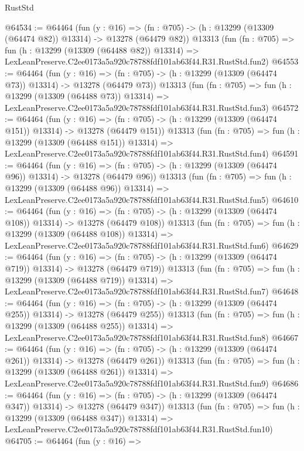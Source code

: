 \begin{lexlean}{RustStd}
\begin{coremodule}
@64534 := @64464
    (fun (y : @16) =>
    (fn : @705) -> (h : @13299 (@13309 (@64474 @82)) @13314) -> @13278 (@64479 @82))
    @13313
    (fun (fn : @705) =>
    fun (h : @13299 (@13309 (@64488 @82)) @13314) =>
    LexLeanPreserve.C2ee0173a5a920c78788fdf101ab63f44.R31.RustStd.fun2)
@64553 := @64464
    (fun (y : @16) =>
    (fn : @705) -> (h : @13299 (@13309 (@64474 @73)) @13314) -> @13278 (@64479 @73))
    @13313
    (fun (fn : @705) =>
    fun (h : @13299 (@13309 (@64488 @73)) @13314) =>
    LexLeanPreserve.C2ee0173a5a920c78788fdf101ab63f44.R31.RustStd.fun3)
@64572 := @64464
    (fun (y : @16) =>
    (fn : @705) -> (h : @13299 (@13309 (@64474 @151)) @13314) -> @13278 (@64479 @151))
    @13313
    (fun (fn : @705) =>
    fun (h : @13299 (@13309 (@64488 @151)) @13314) =>
    LexLeanPreserve.C2ee0173a5a920c78788fdf101ab63f44.R31.RustStd.fun4)
@64591 := @64464
    (fun (y : @16) =>
    (fn : @705) -> (h : @13299 (@13309 (@64474 @96)) @13314) -> @13278 (@64479 @96))
    @13313
    (fun (fn : @705) =>
    fun (h : @13299 (@13309 (@64488 @96)) @13314) =>
    LexLeanPreserve.C2ee0173a5a920c78788fdf101ab63f44.R31.RustStd.fun5)
@64610 := @64464
    (fun (y : @16) =>
    (fn : @705) -> (h : @13299 (@13309 (@64474 @108)) @13314) -> @13278 (@64479 @108))
    @13313
    (fun (fn : @705) =>
    fun (h : @13299 (@13309 (@64488 @108)) @13314) =>
    LexLeanPreserve.C2ee0173a5a920c78788fdf101ab63f44.R31.RustStd.fun6)
@64629 := @64464
    (fun (y : @16) =>
    (fn : @705) -> (h : @13299 (@13309 (@64474 @719)) @13314) -> @13278 (@64479 @719))
    @13313
    (fun (fn : @705) =>
    fun (h : @13299 (@13309 (@64488 @719)) @13314) =>
    LexLeanPreserve.C2ee0173a5a920c78788fdf101ab63f44.R31.RustStd.fun7)
@64648 := @64464
    (fun (y : @16) =>
    (fn : @705) -> (h : @13299 (@13309 (@64474 @255)) @13314) -> @13278 (@64479 @255))
    @13313
    (fun (fn : @705) =>
    fun (h : @13299 (@13309 (@64488 @255)) @13314) =>
    LexLeanPreserve.C2ee0173a5a920c78788fdf101ab63f44.R31.RustStd.fun8)
@64667 := @64464
    (fun (y : @16) =>
    (fn : @705) -> (h : @13299 (@13309 (@64474 @261)) @13314) -> @13278 (@64479 @261))
    @13313
    (fun (fn : @705) =>
    fun (h : @13299 (@13309 (@64488 @261)) @13314) =>
    LexLeanPreserve.C2ee0173a5a920c78788fdf101ab63f44.R31.RustStd.fun9)
@64686 := @64464
    (fun (y : @16) =>
    (fn : @705) -> (h : @13299 (@13309 (@64474 @347)) @13314) -> @13278 (@64479 @347))
    @13313
    (fun (fn : @705) =>
    fun (h : @13299 (@13309 (@64488 @347)) @13314) =>
    LexLeanPreserve.C2ee0173a5a920c78788fdf101ab63f44.R31.RustStd.fun10)
@64705 := @64464
    (fun (y : @16) =>

\end{coremodule}
\end{lexlean}
